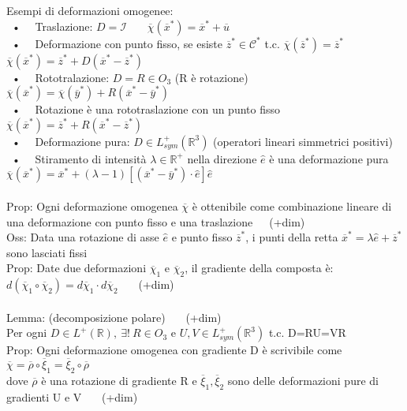 \documentclass{article}
\theoremstyle{unnumbered}
\theoremstyle{unnumbered1}
\begin{document}
%
Esempi di deformazioni omogenee:\\
\ • \ \ Traslazione: $D=\mathcal{I}$ \ \ \ $\overline{\chi}(\overline{x}^*)=\overline{x}^*+\overline{u} $ \\
\ • \ \ Deformazione con punto fisso, se esiste $\overline{z}^*\in\mathcal{C}^*$ t.c. $\overline{\chi}(\overline{z}^*)=\overline{z}^*$ \ \ \  $\overline{\chi}(\overline{x}^*)=\overline{z}^*+D(\overline{x}^*-\overline{z}^*)$ \\
\ • \ \ Rototralazione: $D=R\in O_3$ (R è rotazione)\ \ \  $\overline{\chi}(\overline{x}^*)=\overline{\chi}(\overline{y}^*)+R(\overline{x}^*-\overline{y}^*)$\\
\ • \ \ Rotazione è una rototraslazione con un punto fisso \ \ \  $\overline{\chi}(\overline{x}^*)=\overline{z}^*+R(\overline{x}^*-\overline{z}^*)$\\
\ • \ \ Deformazione pura: $D\in L_{sym}^+(\mathbb{R}^3)$ (operatori lineari simmetrici positivi) \\
%
\ • \ \ Stiramento di intensità $\lambda\in\mathbb{R}^+$ nella direzione $\hat{e}$ è una deformazione pura $\overline{\chi}(\overline{x}^*)=\overline{x}^*+(\lambda-1)[(\overline{x}^*-\overline{y}^*)\cdot\hat{e}]\hat{e}$\\ \\
%
Prop: Ogni deformazione omogenea $\overline{\chi}$ è ottenibile come combinazione lineare di\\
\phantom{Prop: }una deformazione con punto fisso e una traslazione\ \ \ (+dim)\\
%
Oss: Data una rotazione di asse $\hat{e}$ e punto fisso $\overline{z}^*$, i punti della retta $\overline{x}^*=\lambda\hat{e}+\overline{z}^*$ sono lasciati fissi\\
%
%
%
Prop: Date due deformazioni $\overline{\chi}_1$ e $\overline{\chi}_2$, il gradiente della composta è: \ $d(\overline{\chi}_1\circ\overline{\chi}_2)=d\overline{\chi}_1\cdot d\overline{\chi}_2$ \ \ \ (+dim)\\ \\
%
%
%
Lemma: (decomposizione polare) \ \ \ (+dim)\\
Per ogni $D\in L^+(\mathbb{R}),\ \exists!\ R \in O_3 \text{ e } U,V\in L_{sym}^+(\mathbb{R}^3)$ t.c. D=RU=VR \\
%
Prop: Ogni deformazione omogenea con gradiente D è scrivibile come $\overline{\chi}=\overline{\rho}\circ\overline{\xi}_1=\overline{\xi}_2\circ\overline{\rho}$ \\
\phantom{Prop: }dove $\overline{\rho}$ è una rotazione di gradiente R e $\overline{\xi}_1, \overline{\xi}_2$ sono delle deformazioni pure di gradienti U e V \ \ \ (+dim)\\ \\
\end{document}
